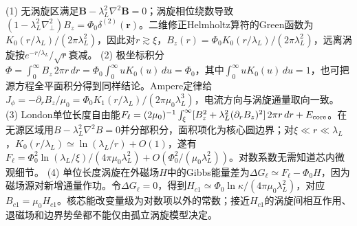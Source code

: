 (1) 无涡旋区满足\(\boldsymbol B-\lambda_L^2\nabla^2\boldsymbol B=0\)；涡旋相位绕数导致\((1-\lambda_L^2\nabla_\perp^2)B_z=\Phi_0\delta^{(2)}(\boldsymbol r)\)。二维修正Helmholtz算符的Green函数为\(K_0(r/\lambda_L)/(2\pi\lambda_L^2)\)，因此对\(r\gtrsim\xi\)，\(B_z(r)=\Phi_0 K_0(r/\lambda_L)/(2\pi\lambda_L^2)\)，远离涡旋按\(e^{-r/\lambda_L}/\sqrt r\)衰减。
(2) 极坐标积分\(\Phi=\int_0^\infty B_z\,2\pi r\,dr=\Phi_0\int_0^\infty uK_0(u)\,du=\Phi_0\)，其中\(\int_0^\infty uK_0(u)\,du=1\)，也可把源方程全平面积分得到同样结论。Ampere定律给\(J_\phi=-\partial_rB_z/\mu_0=\Phi_0 K_1(r/\lambda_L)/(2\pi\mu_0\lambda_L^3)\)，电流方向与涡旋通量取向一致。
(3) London单位长度自由能\(F_\ell=(2\mu_0)^{-1}\int_\xi^\infty[B_z^2+\lambda_L^2(\partial_rB_z)^2]\,2\pi r\,dr+E_{\rm core}\)。在无源区域用\(B-\lambda_L^2\nabla^2B=0\)并分部积分，面积项化为核心圆边界；对\(\xi\ll r\ll\lambda_L\)，\(K_0(r/\lambda_L)\simeq\ln(\lambda_L/r)+O(1)\)，遂有\(F_\ell=\Phi_0^2\ln(\lambda_L/\xi)/(4\pi\mu_0\lambda_L^2)+O(\Phi_0^2/(\mu_0\lambda_L^2))\)。对数系数无需知道芯内微观细节。
(4) 单位长度涡旋在外磁场\(H\)中的Gibbs能量差为\(\Delta G_\ell\simeq F_\ell-\Phi_0H\)，因为磁场源对新增通量作功。令\(\Delta G_\ell=0\)，得到\(H_{c1}\simeq\Phi_0\ln\kappa/(4\pi\mu_0\lambda_L^2)\)，对应\(B_{c1}=\mu_0H_{c1}\)。核芯能改变量级为对数项以外的常数；接近\(H_{c1}\)的涡旋间相互作用、退磁场和边界势垒都不能仅由孤立涡旋模型决定。
